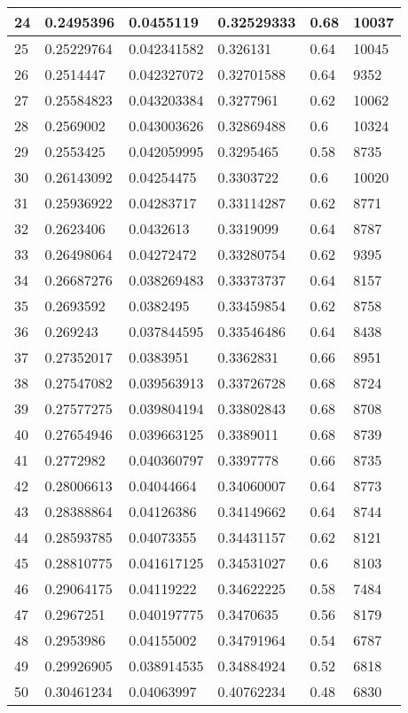 \begin{longtable}{|l|l|l|l|l|l|}
24 & 0.2495396 & 0.0455119 & 0.32529333 & 0.68 & 10037 \\ \hline 
25 & 0.25229764 & 0.042341582 & 0.326131 & 0.64 & 10045 \\ \hline 
26 & 0.2514447 & 0.042327072 & 0.32701588 & 0.64 & 9352 \\ \hline 
27 & 0.25584823 & 0.043203384 & 0.3277961 & 0.62 & 10062 \\ \hline 
28 & 0.2569002 & 0.043003626 & 0.32869488 & 0.6 & 10324 \\ \hline 
29 & 0.2553425 & 0.042059995 & 0.3295465 & 0.58 & 8735 \\ \hline 
30 & 0.26143092 & 0.04254475 & 0.3303722 & 0.6 & 10020 \\ \hline 
31 & 0.25936922 & 0.04283717 & 0.33114287 & 0.62 & 8771 \\ \hline 
32 & 0.2623406 & 0.0432613 & 0.3319099 & 0.64 & 8787 \\ \hline 
33 & 0.26498064 & 0.04272472 & 0.33280754 & 0.62 & 9395 \\ \hline 
34 & 0.26687276 & 0.038269483 & 0.33373737 & 0.64 & 8157 \\ \hline 
35 & 0.2693592 & 0.0382495 & 0.33459854 & 0.62 & 8758 \\ \hline 
36 & 0.269243 & 0.037844595 & 0.33546486 & 0.64 & 8438 \\ \hline 
37 & 0.27352017 & 0.0383951 & 0.3362831 & 0.66 & 8951 \\ \hline 
38 & 0.27547082 & 0.039563913 & 0.33726728 & 0.68 & 8724 \\ \hline 
39 & 0.27577275 & 0.039804194 & 0.33802843 & 0.68 & 8708 \\ \hline 
40 & 0.27654946 & 0.039663125 & 0.3389011 & 0.68 & 8739 \\ \hline 
41 & 0.2772982 & 0.040360797 & 0.3397778 & 0.66 & 8735 \\ \hline 
42 & 0.28006613 & 0.04044664 & 0.34060007 & 0.64 & 8773 \\ \hline 
43 & 0.28388864 & 0.04126386 & 0.34149662 & 0.64 & 8744 \\ \hline 
44 & 0.28593785 & 0.04073355 & 0.34431157 & 0.62 & 8121 \\ \hline 
45 & 0.28810775 & 0.041617125 & 0.34531027 & 0.6 & 8103 \\ \hline 
46 & 0.29064175 & 0.04119222 & 0.34622225 & 0.58 & 7484 \\ \hline 
47 & 0.2967251 & 0.040197775 & 0.3470635 & 0.56 & 8179 \\ \hline 
48 & 0.2953986 & 0.04155002 & 0.34791964 & 0.54 & 6787 \\ \hline 
49 & 0.29926905 & 0.038914535 & 0.34884924 & 0.52 & 6818 \\ \hline 
50 & 0.30461234 & 0.04063997 & 0.40762234 & 0.48 & 6830 \\ \hline 
\end{longtable}